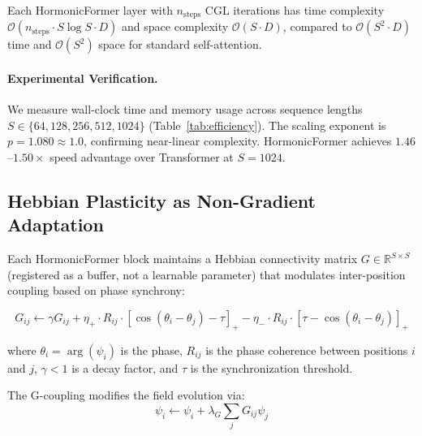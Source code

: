 \begin{theorem}
\label{thm:complexity}
Each HormonicFormer layer with $n_{\mathrm{steps}}$ CGL iterations has time complexity $\mathcal{O}(n_{\mathrm{steps}} \cdot S \log S \cdot D)$ and space complexity $\mathcal{O}(S \cdot D)$, compared to $\mathcal{O}(S^2 \cdot D)$ time and $\mathcal{O}(S^2)$ space for standard self-attention.
\end{theorem}

\paragraph{Experimental Verification.}
We measure wall-clock time and memory usage across sequence lengths $S \in \{64, 128, 256, 512, 1024\}$ (Table~\ref{tab:efficiency}). The scaling exponent is $p = 1.080 \approx 1.0$, confirming near-linear complexity. HormonicFormer achieves $1.46$--$1.50\times$ speed advantage over Transformer at $S = 1024$.

\subsection{Hebbian Plasticity as Non-Gradient Adaptation}

Each HormonicFormer block maintains a Hebbian connectivity matrix $G \in \mathbb{R}^{S \times S}$ (registered as a buffer, not a learnable parameter) that modulates inter-position coupling based on phase synchrony:

\begin{equation}
G_{ij} \leftarrow \gamma G_{ij} + \eta_+ \cdot R_{ij} \cdot [\cos(\theta_i - \theta_j) - \tau]_+ - \eta_- \cdot R_{ij} \cdot [\tau - \cos(\theta_i - \theta_j)]_+
\label{eq:hebbian}
\end{equation}

where $\theta_i = \arg(\psi_i)$ is the phase, $R_{ij}$ is the phase coherence between positions $i$ and $j$, $\gamma < 1$ is a decay factor, and $\tau$ is the synchronization threshold.

The G-coupling modifies the field evolution via:
\begin{equation}
\psi_i \leftarrow \psi_i + \lambda_G \sum_j G_{ij} \psi_j
\label{eq:g-coupling}
\end{equation}

